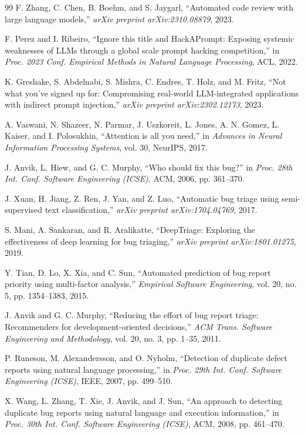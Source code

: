 \begin{thebibliography}{99}
F. Zhang, C. Chen, B. Boehm, and S. Jaygarl, ``Automated code review with large language models,'' \textit{arXiv preprint arXiv:2310.08879}, 2023.

F. Perez and I. Ribeiro, ``Ignore this title and HackAPrompt: Exposing systemic weaknesses of LLMs through a global scale prompt hacking competition,'' in \textit{Proc. 2023 Conf. Empirical Methods in Natural Language Processing}, ACL, 2022.

K. Greshake, S. Abdelnabi, S. Mishra, C. Endres, T. Holz, and M. Fritz, ``Not what you've signed up for: Compromising real-world LLM-integrated applications with indirect prompt injection,'' \textit{arXiv preprint arXiv:2302.12173}, 2023.

A. Vaswani, N. Shazeer, N. Parmar, J. Uszkoreit, L. Jones, A. N. Gomez, L. Kaiser, and I. Polosukhin, ``Attention is all you need,'' in \textit{Advances in Neural Information Processing Systems}, vol. 30, NeurIPS, 2017.

J. Anvik, L. Hiew, and G. C. Murphy, ``Who should fix this bug?'' in \textit{Proc. 28th Int. Conf. Software Engineering (ICSE)}, ACM, 2006, pp. 361--370.

J. Xuan, H. Jiang, Z. Ren, J. Yan, and Z. Luo, ``Automatic bug triage using semi-supervised text classification,'' \textit{arXiv preprint arXiv:1704.04769}, 2017.

S. Mani, A. Sankaran, and R. Aralikatte, ``DeepTriage: Exploring the effectiveness of deep learning for bug triaging,'' \textit{arXiv preprint arXiv:1801.01275}, 2019.

Y. Tian, D. Lo, X. Xia, and C. Sun, ``Automated prediction of bug report priority using multi-factor analysis,'' \textit{Empirical Software Engineering}, vol. 20, no. 5, pp. 1354--1383, 2015.

J. Anvik and G. C. Murphy, ``Reducing the effort of bug report triage: Recommenders for development-oriented decisions,'' \textit{ACM Trans. Software Engineering and Methodology}, vol. 20, no. 3, pp. 1--35, 2011.

P. Runeson, M. Alexandersson, and O. Nyholm, ``Detection of duplicate defect reports using natural language processing,'' in \textit{Proc. 29th Int. Conf. Software Engineering (ICSE)}, IEEE, 2007, pp. 499--510.

X. Wang, L. Zhang, T. Xie, J. Anvik, and J. Sun, ``An approach to detecting duplicate bug reports using natural language and execution information,'' in \textit{Proc. 30th Int. Conf. Software Engineering (ICSE)}, ACM, 2008, pp. 461--470.


\end{thebibliography}
